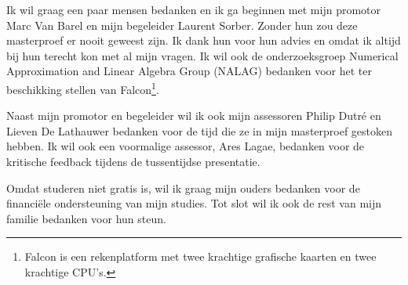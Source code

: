 \documentclass[master=cws ,masteroption=gs]{kulemt}
\begin{document}
\begin{preface}
	Ik wil graag een paar mensen bedanken en ik ga beginnen met mijn promotor Marc Van Barel en mijn begeleider Laurent Sorber. Zonder hun zou deze masterproef er nooit geweest zijn. Ik dank hun voor hun advies en omdat ik altijd bij hun terecht kon met al mijn vragen. Ik wil ook de onderzoeksgroep Numerical Approximation and Linear Algebra Group (NALAG) bedanken voor het ter beschikking stellen van Falcon\footnote{Falcon is een rekenplatform met twee krachtige grafische kaarten en twee krachtige CPU's.}.
	
	Naast mijn promotor en begeleider wil ik ook mijn assessoren Philip Dutr\'e en Lieven De Lathauwer bedanken voor de tijd die ze in mijn masterproef gestoken hebben. Ik wil ook een voormalige assessor, Ares Lagae, bedanken voor de kritische feedback tijdens de tussentijdse presentatie.
	
	Omdat studeren niet gratis is, wil ik graag mijn ouders bedanken voor de financi\"ele ondersteuning van mijn studies.
	Tot slot wil ik ook de rest van mijn familie bedanken voor hun steun.
\end{preface}

\tableofcontents*

\begin{abstract}
	We kunnen een tensor voorstellen als een meerdimensionale rij. Er zijn algoritmes die de tensor ontbinden in een Canonieke Polyadische Decompositie (CPD). Deze ontbinding kan ook een benadering zijn. In deze masterproef gaan we kernels ontwikkelen om gradi\"ent gebaseerde optimalisatie-algoritmes te ondersteunen. Dit is een groep van algoritmes die op zoek gaat naar de best benaderende CPD voor een gegeven tensor. 
  
	Na de inleiding beschrijven we de wiskundige concepten die we nodig hebben om de kernels te ontwikkelen. Vervolgens bespreken het programmeermodel van OpenCL en de architectuur van de AMD Radeon HD 6970. Al onze kernels zijn geoptimaliseerd voor deze grafische kaart.
  
	Nadat we weten hoe OpenCL en de grafische kaart in elkaar zitten gaan we een paar berekeningen doen. Met deze berekeningen onderzoeken we de theoretisch grensen van de kernels die we gaan ontwikkelen. Nadat de kernels een groen licht gekregen hebben bespreken we stapsgewijs hoe de kernels in elkaar zitten en waarom die zo in elkaar zitten. We zullen bij elke stap ook een paar metingen doen zodat de effecten van de optimalisaties zichtbaar zijn.
  
	Eenmaal de kernels ontwikkeld zijn gaan we metingen doen en die bespreken. Tot slot gaan we het werk evalueren en uitbreidingsvoorstellen doen.

	
\end{abstract}
\end{document}
